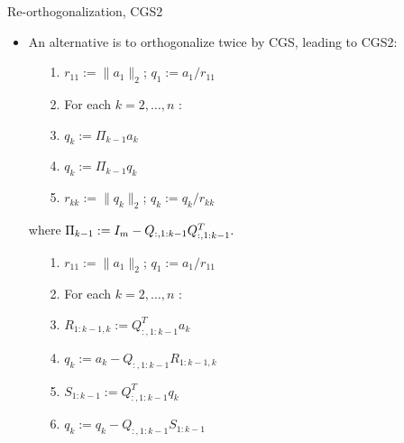 \documentclass[t,usepdftitle=false]{beamer}
\begin{document}
\begin{frame}{Re-orthogonalization, CGS2}
\begin{itemize}
\item An alternative is to orthogonalize twice by CGS, leading to CGS2:\\
\begin{minipage}[lt]{0.51\textwidth}\vspace{-.2cm}
\begin{itemize}
\item[1.] $r_{11}:=\|a_1\|_2$; $q_1:=a_1/r_{11}$ \vspace{-.1cm}
\item[2.] For each $k=2,\dots,n$ :\vspace{-.1cm}
\item[3.]\hspace{.4cm}$q_k:=\Pi_{k-1}a_k$\vspace{-.1cm}
\item[4.]\hspace{.4cm}$q_k:=\Pi_{k-1}q_k$\vspace{-.1cm}
\item[5.]\hspace{.4cm}$r_{kk}:=\|q_k\|_2$; $q_{k}:=q_k/r_{kk}$
\end{itemize}\vspace{.2cm}
where $\Pi_{k-1}:=I_m-Q_{:,1:k-1}Q_{:,1:k-1}^T.\hspace{-1cm}$
\end{minipage}
\begin{minipage}[lt]{0.43\textwidth}\vspace{.3cm}
\begin{itemize}
\item[1.] $r_{11}:=\|a_1\|_2$; $q_1:=a_1/r_{11}$ \vspace{-.1cm}
\item[2.] For each $k=2,\dots,n$ :\vspace{-.1cm}
\item[3.]\hspace{.4cm}$R_{1:k-1,k}:=Q_{:,1:k-1}^Ta_k$ \vspace{-.1cm}
\item[4.]\hspace{.4cm}$q_k:=a_k-Q_{:,1:k-1}R_{1:k-1,k}$ \vspace{-.1cm}
\item[5.]\hspace{.4cm}$S_{1:k-1}:=Q_{:,1:k-1}^Tq_k$ \vspace{-.1cm}
\item[6.]\hspace{.4cm}$q_k:=q_k-Q_{:,1:k-1}S_{1:k-1}$ \vspace{-.1cm}

\end{itemize}
\end{minipage}
\end{itemize}
\end{frame}
\end{document}
